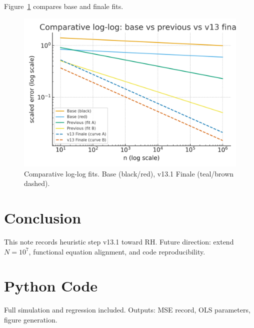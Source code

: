 \documentclass[11pt]{article}
\begin{document}
Figure~\ref{fig1} compares base and finale fits.

\begin{figure}[h]
\centering
\includegraphics[width=0.8\linewidth]{figure1.png}
\caption{Comparative log-log fits. Base (black/red), v13.1 Finale (teal/brown dashed).}
\label{fig1}
\end{figure}

\section{Conclusion}
This note records heuristic step v13.1 toward RH. 
Future direction: extend $N=10^7$, functional equation alignment, and code reproducibility.

\appendix
\section{Python Code}
Full simulation and regression included. Outputs: MSE record, OLS parameters, figure generation.
\end{document}
